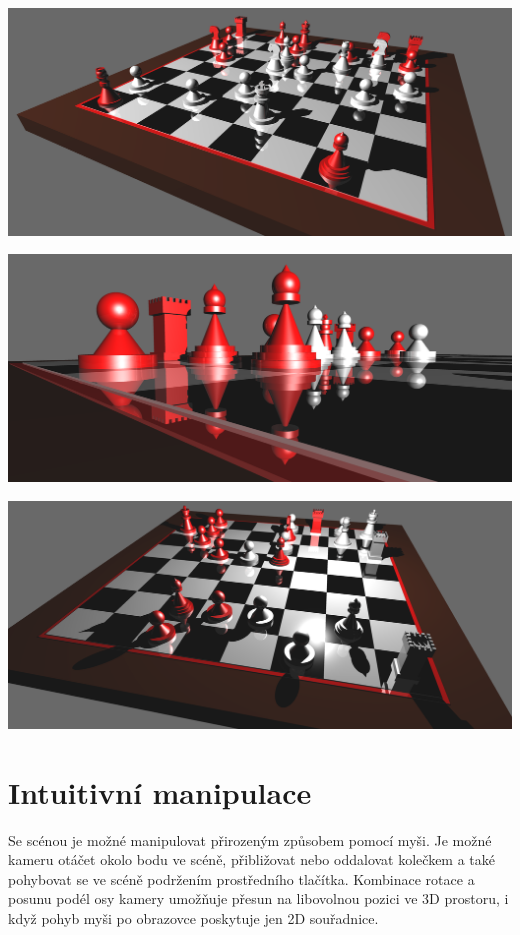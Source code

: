 \documentclass[12pt,a4paper,titlepage,final]{report}
\begin{document}
\begin{center}
	\captionsetup{type=figure}
		\includegraphics[width=0.8\linewidth]{images/scene1.png}
	\label{fig:chess1}
\end{center}

\begin{center}
	\captionsetup{type=figure}
	\includegraphics[width=0.8\linewidth]{images/scene2.png}
	\label{fig:chess2}
\end{center}

\begin{center}
	\captionsetup{type=figure}
	\includegraphics[width=0.8\linewidth]{images/scene3.png}
	\label{fig:chess3}
\end{center}

\section{Intuitivní manipulace}
Se scénou je možné manipulovat přirozeným způsobem pomocí myši. Je možné kameru otáčet okolo bodu ve scéně, přibližovat nebo oddalovat kolečkem a také pohybovat se ve scéně podržením prostředního tlačítka.
Kombinace rotace a posunu podél osy kamery umožňuje přesun na libovolnou pozici ve 3D prostoru, i když pohyb myši po obrazovce poskytuje jen 2D souřadnice. 
\end{document}
